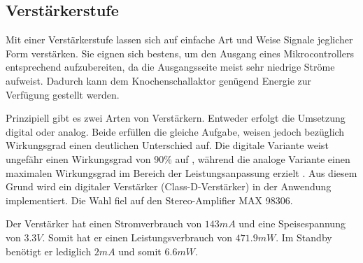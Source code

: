 \subsection{Verstärkerstufe} \label{sec:verstaerkerstufe}

Mit einer Verstärkerstufe lassen sich auf einfache Art und Weise Signale jeglicher Form verstärken. Sie eignen sich bestens, um den Ausgang eines Mikrocontrollers entsprechend aufzubereiten, da die Ausgangsseite meist sehr niedrige Ströme aufweist. Dadurch kann dem Knochenschallaktor genügend Energie zur Verfügung gestellt werden.

Prinzipiell gibt es zwei Arten von Verstärkern. Entweder erfolgt die Umsetzung digital oder analog. Beide erfüllen die gleiche Aufgabe, weisen jedoch bezüglich Wirkungsgrad einen deutlichen Unterschied auf. Die digitale Variante weist ungefähr einen Wirkungsgrad von 90$\%$ auf \cite{BoneConductorAdafruit}, während die analoge Variante einen maximalen Wirkungsgrad im Bereich der Leistungsanpassung erzielt \cite{Niklaus_Skript}. Aus diesem Grund wird ein digitaler Verstärker (Class-D-Verstärker) in der Anwendung implementiert. Die Wahl fiel auf den Stereo-Amplifier MAX 98306.

Der Verstärker hat einen Stromverbrauch von $143mA$ und eine Speisespannung von $3.3V$. Somit hat er einen Leistungsverbrauch von $471.9 mW$. Im Standby benötigt er lediglich $2 mA$ und somit $6.6 mW$.